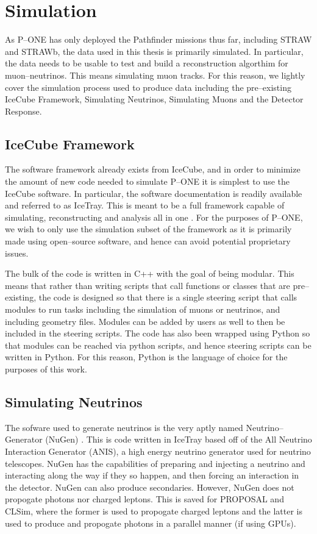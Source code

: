 \chapter{Simulation}

As P--ONE has only deployed the Pathfinder missions thus far, including STRAW and STRAWb, the data used in this thesis is primarily simulated. In particular, the data needs to be usable to test and build a reconstruction algorthim for muon--neutrinos. This means simulating muon tracks. For this reason, we lightly cover the simulation process used to produce data including the pre--existing IceCube Framework, Simulating Neutrinos, Simulating Muons and the Detector Response. 

\section{IceCube Framework}

The software framework already exists from IceCube, and in order to minimize the amount of new code needed to simulate P--ONE it is simplest to use the IceCube software. In particular, the software documentation is readily available \cite{icetray} and referred to as IceTray. This is meant to be a full framework capable of simulating, reconstructing and analysis all in one \cite{icetray}. For the purposes of P--ONE, we wish to only use the simulation subset of the framework as it is primarily made using open--source software, and hence can avoid potential proprietary issues.

The bulk of the code is written in C++ with the goal of being modular. This means that rather than writing scripts that call functions or classes that are pre--existing, the code is designed so that there is a single steering script that calls modules to run tasks including the simulation of muons or neutrinos, and including geometry files. Modules can be added by users as well to then be included in the steering scripts. The code has also been wrapped using Python so that modules can be reached via python scripts, and hence steering scripts can be written in Python. For this reason, Python is the language of choice for the purposes of this work.

\section{Simulating Neutrinos}

The sofware used to generate neutrinos is the very aptly named Neutrino--Generator (NuGen) \cite{icetray}. This is code written in IceTray based off of the All Neutrino Interaction Generator (ANIS), a high energy neutrino generator used for neutrino telescopes. NuGen has the capabilities of preparing and injecting a neutrino and interacting along the way if they so happen, and then forcing an interaction in the detector. NuGen can also produce secondaries. However, NuGen does not propogate photons nor charged leptons. This is saved for PROPOSAL and CLSim, where the former is used to propogate charged leptons and the latter is used to produce and propogate photons in a parallel manner (if using GPUs).

